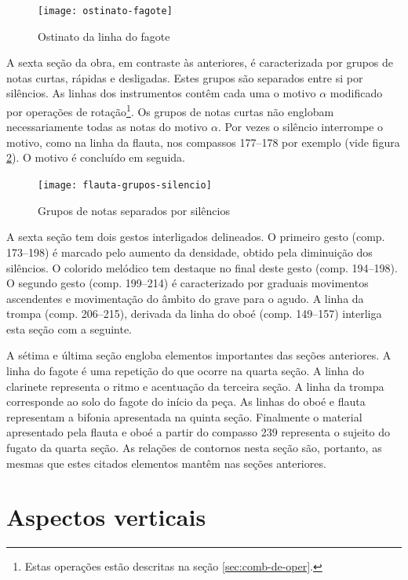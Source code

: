 \begin{figure}
  \centering
  \texttt{[image: ostinato-fagote]}
  \caption{Ostinato da linha do fagote}
  \label{fig:ostinato-fagote}
\end{figure}

A sexta seção da obra, em contraste às anteriores, é caracterizada por
grupos de notas curtas, rápidas e desligadas. Estes grupos são
separados entre si por silêncios. As linhas dos instrumentos contêm
cada uma o motivo $\alpha$ modificado por operações de
rotação\footnote{Estas operações estão descritas na seção
  \ref{sec:comb-de-oper}.}. Os grupos de notas curtas não englobam
necessariamente todas as notas do motivo $\alpha$. Por vezes o
silêncio interrompe o motivo, como na linha da flauta, nos compassos
177--178 por exemplo (vide figura
\ref{fig:grupos-separados-silencio}). O motivo é concluído em seguida.

\begin{figure}
  \centering
  \texttt{[image: flauta-grupos-silencio]}
  \caption{Grupos de notas separados por silêncios}
  \label{fig:grupos-separados-silencio}
\end{figure}

A sexta seção tem dois gestos interligados delineados. O primeiro
gesto (comp. 173--198) é marcado pelo aumento da densidade, obtido
pela diminuição dos silêncios. O colorido melódico tem destaque no
final deste gesto (comp. 194--198). O segundo gesto (comp. 199--214) é
caracterizado por graduais movimentos ascendentes e movimentação do
âmbito do grave para o agudo. A linha da trompa (comp. 206--215),
derivada da linha do oboé (comp. 149--157) interliga esta seção com a
seguinte.

A sétima e última seção engloba elementos importantes das seções
anteriores. A linha do fagote é uma repetição do que ocorre na quarta
seção. A linha do clarinete representa o ritmo e acentuação da
terceira seção. A linha da trompa corresponde ao solo do fagote do
início da peça. As linhas do oboé e flauta representam a bifonia
apresentada na quinta seção. Finalmente o material apresentado pela
flauta e oboé a partir do compasso 239 representa o sujeito do fugato
da quarta seção. As relações de contornos nesta seção são, portanto,
as mesmas que estes citados elementos mantêm nas seções anteriores.

\section{Aspectos verticais}
\label{sec:aspectos-verticais}

